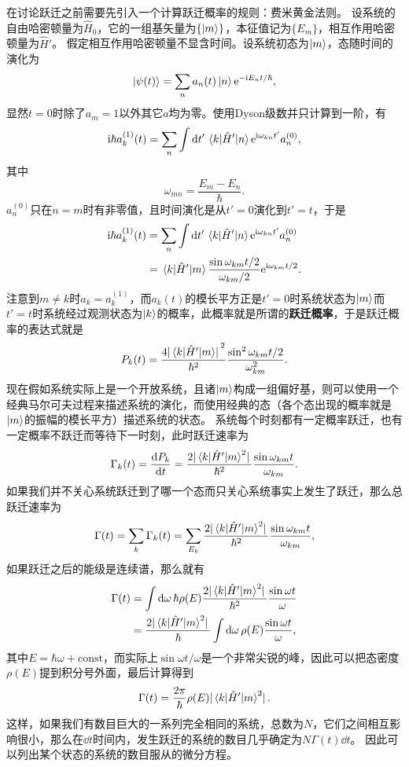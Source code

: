 \documentclass[UTF8, a4paper]{ctexart}
\newcommand*{\ee}{\mathrm{e}}
\newcommand*{\ii}{\mathrm{i}}
\newcommand*{\const}{\mathrm{const}}
\begin{document}
在讨论跃迁之前需要先引入一个计算跃迁概率的规则：费米黄金法则。
设系统的自由哈密顿量为$\hat{H}_0$，它的一组基矢量为$\{\ket{m}\}$，本征值记为$\{E_m\}$，相互作用哈密顿量为$\hat{H}'$。
假定相互作用哈密顿量不显含时间。设系统初态为$\ket{m}$，态随时间的演化为
\[
    \ket{\psi(t)} = \sum_n a_n(t) \ket{n} \ee^{- \ii E_n t / \hbar},
\]
显然$t=0$时除了$a_m=1$以外其它$a$均为零。使用Dyson级数并只计算到一阶，有
\[
    \ii \hbar a^{(1)}_k(t) = \sum_n \int \dd{t'} \mel{k}{\hat{H}'}{n} \ee^{\ii \omega_{kn} t'} a_n^{(0)},
\]
其中
\[
    \omega_{mn} = \frac{E_m - E_n}{\hbar}.
\]
$a_n^{(0)}$只在$n=m$时有非零值，且时间演化是从$t'=0$演化到$t'=t$，于是
\[
    \begin{aligned}
        \ii \hbar a^{(1)}_k(t) &= \sum_n \int \dd{t'} \mel{k}{\hat{H}'}{n} \ee^{\ii \omega_{kn} t'} a_n^{(0)} \\
        &= \mel{k}{\hat{H}'}{m} \frac{\sin \omega_{km} t / 2}{\omega_{km} / 2} \ee^{\ii \omega_{km} t / 2}. 
    \end{aligned}
\]
注意到$m \neq k$时$a_k = a_k^{(1)}$，而$a_k(t)$的模长平方正是$t'=0$时系统状态为$\ket{m}$而$t'=t$时系统经过观测状态为$\ket{k}$的概率，此概率就是所谓的\textbf{跃迁概率}，于是跃迁概率的表达式就是
\begin{equation}
    P_k(t) = \frac{4 \abs*{\mel{k}{\hat{H}'}{m}}^2}{\hbar^2} \frac{\sin^2 \omega_{km} t / 2}{\omega_{km}^2}.
\end{equation}
现在假如系统实际上是一个开放系统，且诸$\ket{m}$构成一组偏好基，则可以使用一个经典马尔可夫过程来描述系统的演化，而使用经典的态（各个态出现的概率就是$\ket{m}$的振幅的模长平方）描述系统的状态。
系统每个时刻都有一定概率跃迁，也有一定概率不跃迁而等待下一时刻，此时跃迁速率为
\begin{equation}
    \Gamma_k(t) = \dv{P_k}{t} = \frac{2 \abs*{\mel{k}{\hat{H}'}{m}^2}}{\hbar^2} \frac{\sin \omega_{km} t}{\omega_{km}}.
\end{equation}
如果我们并不关心系统跃迁到了哪一个态而只关心系统事实上发生了跃迁，那么总跃迁速率为
\[
    \Gamma(t) = \sum_k \Gamma_k(t) = \sum_{E_k} \frac{2 \abs*{\mel{k}{\hat{H}'}{m}^2}}{\hbar^2} \frac{\sin \omega_{km} t}{\omega_{km}},
\]
如果跃迁之后的能级是连续谱，那么就有
\[
    \begin{aligned}
        \Gamma(t) &= \int \dd{\omega} \hbar \rho(E) \frac{2 \abs*{\mel{k}{\hat{H}'}{m}^2}}{\hbar^2} \frac{\sin \omega t}{\omega} \\
        &= \frac{2 \abs*{\mel{k}{\hat{H}'}{m}^2}}{\hbar} \int \dd{\omega} \rho(E) \frac{\sin \omega t}{\omega}, 
    \end{aligned}
\]
其中$E = \hbar \omega + \const$，而实际上$\sin \omega t / \omega$是一个非常尖锐的峰，因此可以把态密度$\rho(E)$提到积分号外面，最后计算得到
\begin{equation}
    \Gamma(t) = \frac{2\pi}{\hbar} \rho(E) \abs*{\mel{k}{\hat{H}'}{m}^2}.
\end{equation}
这样，如果我们有数目巨大的一系列完全相同的系统，总数为$N$，它们之间相互影响很小，那么在$\dd{t}$时间内，发生跃迁的系统的数目几乎确定为$N \Gamma(t) \dd{t}$。
因此可以列出某个状态的系统的数目服从的微分方程。
\end{document}
